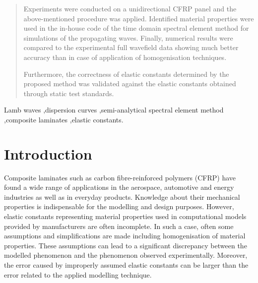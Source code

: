 \documentclass[preprint,12pt]{elsarticle}
\begin{document}
\begin{frontmatter}
\begin{abstract}
Experiments were conducted on a unidirectional CFRP panel and the above-mentioned procedure was applied. 
Identified material properties were used in the in-house code of the time domain spectral element method for simulations of the propagating waves. 
Finally, numerical results were compared to the experimental full wavefield data showing much better accuracy than in case of application of homogenisation techniques.

Furthermore, the correctness of elastic constants determined by the proposed method was validated against the elastic constants obtained through static test standards.
\end{abstract}
		
		\begin{keyword}
			Lamb waves \sep dispersion curves \sep semi-analytical spectral element method \sep composite laminates \sep elastic constants.
			
			
		\end{keyword}
		
	\end{frontmatter}
	
	
\section{Introduction}
Composite laminates such as carbon fibre-reinforced polymers (CFRP) have found a wide range of applications in the aerospace, automotive and energy industries as well as in everyday products. Knowledge about their mechanical properties is indispensable for the modelling and design purposes.
However, elastic constants representing material properties used in computational models provided by manufacturers are often incomplete. 
In such a case, often some assumptions and simplifications are made including homogenisation of material properties. 
These assumptions can lead to a significant discrepancy between the modelled phenomenon and the phenomenon observed experimentally.
Moreover, the error caused by improperly assumed elastic constants can be larger than the error related to the applied modelling technique.	
\end{document}
